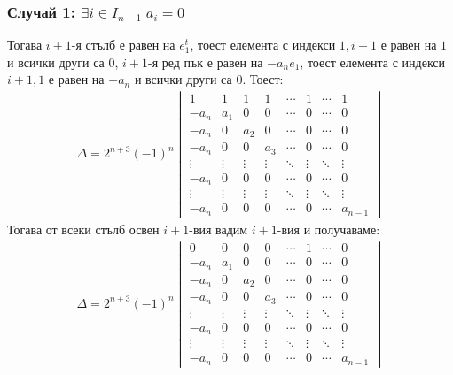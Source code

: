 \documentclass[a4paper, 12pt, oneside]{article}
\begin{document}
\subsubsection*{Случай 1: \(\exists i \in I_{n - 1} \; a_i = 0\)}
Тогава \(i + 1\)-я стълб е равен на \(e_1^t\), тоест елемента с индекси \(1, i + 1\) е равен на \(1\) и всички други са \(0\),
\(i + 1\)-я ред пък е равен на \(-a_n e_1\), тоест елемента с индекси \(i + 1, 1\) е равен на \(-a_n\) и всички други са \(0\).
Тоест:
\begin{align*}
\Delta = 2^{n + 3}(-1)^n\begin{vmatrix}
    1      & 1      & 1      & 1      & \cdots & 1      & \cdots & 1      \\
    -a_n   & a_1    & 0      & 0      & \cdots & 0      & \cdots & 0      \\
    -a_n   & 0      & a_2    & 0      & \cdots & 0      & \cdots & 0      \\
    -a_n   & 0      & 0      & a_3    & \cdots & 0      & \cdots & 0      \\
    \vdots & \vdots & \vdots & \vdots & \ddots & \vdots & \ddots & \vdots \\
    -a_n   & 0      & 0      & 0      & \cdots & 0      & \cdots & 0      \\
    \vdots & \vdots & \vdots & \vdots & \ddots & \vdots & \ddots & \vdots \\
    -a_n   & 0      & 0      & 0      & \cdots & 0      & \cdots & a_{n - 1}
\end{vmatrix}
\end{align*}
Тогава от всеки стълб освен \(i + 1\)-вия вадим \(i + 1\)-вия и получаваме:
\begin{align*}
\Delta = 2^{n + 3}(-1)^n\begin{vmatrix}
    0       & 0      & 0      & 0      & \cdots & 1      & \cdots & 0      \\
    -a_n    & a_1    & 0      & 0      & \cdots & 0      & \cdots & 0      \\
    -a_n    & 0      & a_2    & 0      & \cdots & 0      & \cdots & 0      \\
    -a_n    & 0      & 0      & a_3    & \cdots & 0      & \cdots & 0      \\
    \vdots  & \vdots & \vdots & \vdots & \ddots & \vdots & \ddots & \vdots \\
    -a_n    & 0      & 0      & 0      & \cdots & 0      & \cdots & 0      \\
    \vdots  & \vdots & \vdots & \vdots & \ddots & \vdots & \ddots & \vdots \\
    -a_n    & 0      & 0      & 0      & \cdots & 0      & \cdots & a_{n - 1}
\end{vmatrix}
\end{align*}
\end{document}
